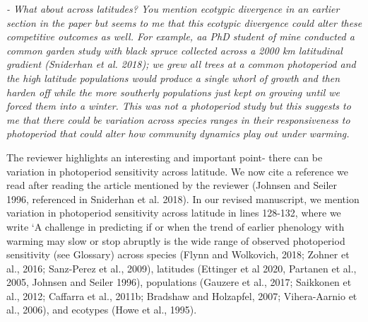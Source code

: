 \documentclass{article}
\begin{document}
 \par \emph{- What about across latitudes? You mention ecotypic divergence in an earlier section in the paper but seems to me that this ecotypic divergence could alter these competitive outcomes as well. For example, aa PhD student of mine conducted a common garden study with black spruce collected across a 2000 km latitudinal gradient (Sniderhan et al. 2018); we grew all trees at a common photoperiod and the high latitude populations would produce a single whorl of growth and then harden off while the more southerly populations just kept on growing until we forced them into a winter. This was not a photoperiod study but this suggests to me that there could be variation across species ranges in their responsiveness to photoperiod that could alter how community dynamics play out under warming.}
\par The reviewer highlights an interesting and important point- there can be variation in photoperiod sensitivity across latitude. We now cite a reference we read after reading the article mentioned by the reviewer (Johnsen and Seiler 1996, referenced in Sniderhan et al. 2018). In our revised manuscript, we mention variation in photoperiod sensitivity across latitude in lines 128-132, where we write `A challenge in predicting if or when the trend of earlier phenology with warming may slow or stop abruptly is the wide range of observed photoperiod sensitivity (see Glossary) across species (Flynn and Wolkovich, 2018; Zohner et al., 2016; Sanz-Perez et al., 2009), latitudes (Ettinger et al 2020, Partanen et al., 2005, Johnsen and Seiler 1996), populations (Gauzere et al., 2017; Saikkonen et al., 2012; Caffarra et al., 2011b; Bradshaw and Holzapfel, 2007; Vihera-Aarnio et al., 2006), and ecotypes (Howe et al., 1995).
\end{document}
